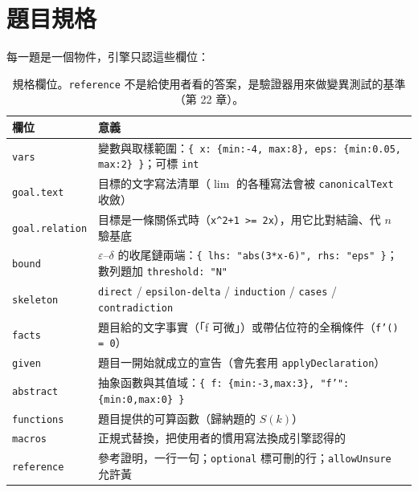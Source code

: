 \documentclass[11pt,a4paper,oneside]{book}
\renewcommand{\_}{\ifmmode\origunderscore\else\textunderscore\allowbreak\fi}
\newcommand{\code}[1]{\texttt{#1}}
\begin{document}
\section{題目規格}
每一題是一個物件，引擎只認這些欄位：
\begin{table}[h]
\centering\small\sffamily
\begin{tabularx}{\textwidth}{@{}lY@{}}
\toprule
欄位 & 意義 \\
\midrule
\code{vars} & 變數與取樣範圍：\code{\{ x: \{min:-4, max:8\}, eps: \{min:0.05, max:2\} \}}；可標 \code{int} \\
\code{goal.text} & 目標的文字寫法清單（$\lim$ 的各種寫法會被 \code{canonicalText} 收斂） \\
\code{goal.relation} & 目標是一條關係式時（\code{x\string^2+1 >= 2x}），用它比對結論、代 $n$ 驗基底 \\
\code{bound} & $\varepsilon$–$\delta$ 的收尾鏈兩端：\code{\{ lhs: "abs(3*x-6)", rhs: "eps" \}}；數列題加 \code{threshold: "N"} \\
\code{skeleton} & \code{direct} / \code{epsilon-delta} / \code{induction} / \code{cases} / \code{contradiction} \\
\code{facts} & 題目給的文字事實（「f 可微」）或帶佔位符的全稱條件（\code{f'(\_) = 0}） \\
\code{given} & 題目一開始就成立的宣告（會先套用 \code{applyDeclaration}） \\
\code{abstract} & 抽象函數與其值域：\code{\{ f: \{min:-3,max:3\}, "f'": \{min:0,max:0\} \}} \\
\code{functions} & 題目提供的可算函數（歸納題的 $S(k)$） \\
\code{macros} & 正規式替換，把使用者的慣用寫法換成引擎認得的 \\
\code{reference} & 參考證明，一行一句；\code{optional} 標可刪的行；\code{allowUnsure} 允許黃 \\
\bottomrule
\end{tabularx}
\caption{規格欄位。\code{reference} 不是給使用者看的答案，是驗證器用來做變異測試的基準（第 22 章）。}
\end{table}
\end{document}

